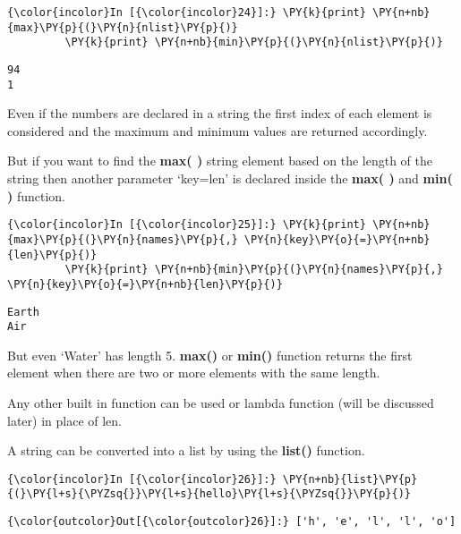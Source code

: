     \begin{Verbatim}[commandchars=\\\{\}]
{\color{incolor}In [{\color{incolor}24}]:} \PY{k}{print} \PY{n+nb}{max}\PY{p}{(}\PY{n}{nlist}\PY{p}{)}
         \PY{k}{print} \PY{n+nb}{min}\PY{p}{(}\PY{n}{nlist}\PY{p}{)}
\end{Verbatim}

    \begin{Verbatim}[commandchars=\\\{\}]
94
1
    \end{Verbatim}

    Even if the numbers are declared in a string the first index of each
element is considered and the maximum and minimum values are returned
accordingly.

    But if you want to find the \textbf{max( )} string element based on the
length of the string then another parameter `key=len' is declared inside
the \textbf{max( )} and \textbf{min( )} function.

    \begin{Verbatim}[commandchars=\\\{\}]
{\color{incolor}In [{\color{incolor}25}]:} \PY{k}{print} \PY{n+nb}{max}\PY{p}{(}\PY{n}{names}\PY{p}{,} \PY{n}{key}\PY{o}{=}\PY{n+nb}{len}\PY{p}{)}
         \PY{k}{print} \PY{n+nb}{min}\PY{p}{(}\PY{n}{names}\PY{p}{,} \PY{n}{key}\PY{o}{=}\PY{n+nb}{len}\PY{p}{)}
\end{Verbatim}

    \begin{Verbatim}[commandchars=\\\{\}]
Earth
Air
    \end{Verbatim}

    But even `Water' has length 5. \textbf{max()} or \textbf{min()} function
returns the first element when there are two or more elements with the
same length.

Any other built in function can be used or lambda function (will be
discussed later) in place of len.

A string can be converted into a list by using the \textbf{list()}
function.

    \begin{Verbatim}[commandchars=\\\{\}]
{\color{incolor}In [{\color{incolor}26}]:} \PY{n+nb}{list}\PY{p}{(}\PY{l+s}{\PYZsq{}}\PY{l+s}{hello}\PY{l+s}{\PYZsq{}}\PY{p}{)}
\end{Verbatim}

            \begin{Verbatim}[commandchars=\\\{\}]
{\color{outcolor}Out[{\color{outcolor}26}]:} ['h', 'e', 'l', 'l', 'o']
\end{Verbatim}
        
